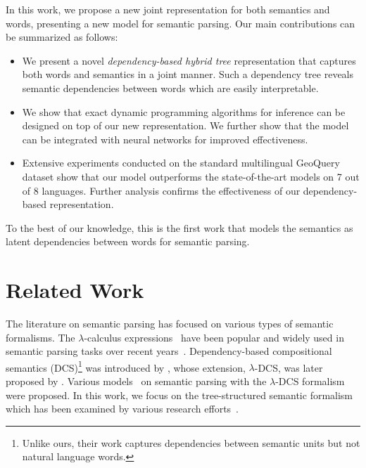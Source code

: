 In this work, we propose a new joint representation for both semantics and words, presenting a new model for semantic parsing. 
Our main contributions can be summarized as follows: 
\begin{itemize}

\item We present a novel {\em dependency-based hybrid tree} representation that captures both words and semantics in a joint manner.
Such a dependency tree reveals semantic dependencies between words which are easily interpretable. 

\item We show that exact dynamic programming algorithms for inference can be designed on top of our new representation.  We further show that the model can be integrated with neural networks for improved effectiveness.
\item Extensive experiments conducted on the standard multilingual GeoQuery dataset 
show that our model outperforms the state-of-the-art models on 7 out of 8 languages. Further analysis confirms the effectiveness of our  dependency-based representation.
\end{itemize}

To the best of our knowledge, this is the first work that models the semantics as latent dependencies between   words for semantic parsing. 

{\color{red}
	
}



\section{Related Work}
The literature on semantic parsing has focused on various types of semantic formalisms. 
The $\lambda$-calculus expressions~\cite{zettlemoyer2005learning} have been popular and widely used in semantic parsing tasks over recent years~\cite{dong2016language,gardner2017open,reddy2016transforming,reddy2017universal,susanto2017neural,cheng2017learning}. 
Dependency-based compositional semantics (DCS)\footnote{Unlike ours, their work captures dependencies between  semantic units but not natural language words.} was introduced by \citet{liang11learning}, whose extension, $\lambda$-DCS, was later proposed by \citet{liang2013lambda}. 
Various models~\cite{berant2013semantic,wang2015building,jia-liang:2016:P16-1}  on semantic parsing with the $\lambda$-DCS formalism were proposed. 
In this work, we focus on the tree-structured semantic formalism which has been examined by various research efforts~\cite{wong2006learning,kate2006using,lu2008generative,kwiatkowski2010inducing,jones2012semantic,lu2014semantic,yan2018learn}.

